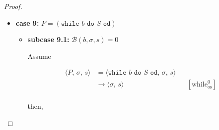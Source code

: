 \documentclass{article}
\begin{document}
\begin{proof}
\begin{itemize}
\begin{itemize}
\[\begin{aligned}
              && \text{(induction hypothesis)} \\
              &\triangleright \langle \texttt{NOOP},\, e',\, \underline{\sigma}' ,\, s',\, pc_{\texttt{CSCOPE}_2} + l_{S_2} + 2 \rangle
              && \text{(operational semantics)} \\
              &\triangleright \langle \epsilon,\, e',\, \underline{\sigma}' ,\, s',\, pc_{\texttt{CSCOPE}_2} + l_{S_2} + 3 \rangle
              && \text{(operational semantics)} \\
              \end{aligned}
          \]
                
        \end{itemize}

    \item \textbf{case 9:} $P = (\texttt{while } b \texttt{ do } S \texttt{ od})$\\

        \begin{itemize}
            \item \textbf{subcase 9.1:} $\mathcal{B}(b, \sigma, s) = 0$

            Assume

            \[
                  \begin{aligned}
                  \langle P,\, \sigma,\, s \rangle
                  &=\langle \texttt{while } b \texttt{ do } S \texttt{ od},\, \sigma,\, s \rangle \\
                  &\rightarrow \langle \sigma ,\, s \rangle
                  && [\text{while}^0_{\text{os}}]   \\
                  \end{aligned}
              \]

            then,


\end{itemize}
\end{itemize}
\end{proof}
\end{document}

